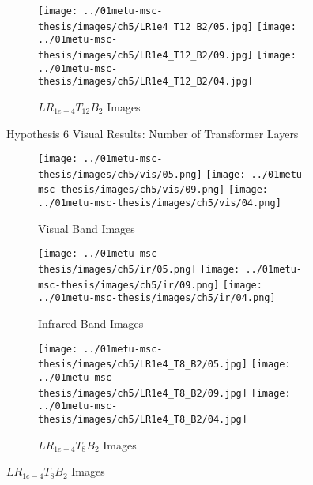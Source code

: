 \begin{figure}[htbp]
    \begin{subfigure}[b]{\textwidth}
        \texttt{[image: ../01metu-msc-thesis/images/ch5/LR1e4\_T12\_B2/05.jpg]}
        \texttt{[image: ../01metu-msc-thesis/images/ch5/LR1e4\_T12\_B2/09.jpg]}
        \texttt{[image: ../01metu-msc-thesis/images/ch5/LR1e4\_T12\_B2/04.jpg]}
        \caption{$LR_{1e-4}T_{12}B_{2}$ Images}
    \end{subfigure}
    \caption{Hypothesis 6 Visual Results: Number of Transformer Layers }
    \label{fig:ch5:met81}
\end{figure}

\begin{figure}[htbp]
    \centering
    \begin{subfigure}[b]{\textwidth}
        \texttt{[image: ../01metu-msc-thesis/images/ch5/vis/05.png]}
        \texttt{[image: ../01metu-msc-thesis/images/ch5/vis/09.png]}
        \texttt{[image: ../01metu-msc-thesis/images/ch5/vis/04.png]}
        \caption{Visual Band Images}
    \end{subfigure}
    \vspace{0.01cm}
    \begin{subfigure}[b]{\textwidth}
        \texttt{[image: ../01metu-msc-thesis/images/ch5/ir/05.png]}
        \texttt{[image: ../01metu-msc-thesis/images/ch5/ir/09.png]}
        \texttt{[image: ../01metu-msc-thesis/images/ch5/ir/04.png]}
        \caption{Infrared Band Images}
    \end{subfigure}
    \vspace{0.01cm}
    \begin{subfigure}[b]{\textwidth}
        \texttt{[image: ../01metu-msc-thesis/images/ch5/LR1e4\_T8\_B2/05.jpg]}
        \texttt{[image: ../01metu-msc-thesis/images/ch5/LR1e4\_T8\_B2/09.jpg]}
        \texttt{[image: ../01metu-msc-thesis/images/ch5/LR1e4\_T8\_B2/04.jpg]}
        \caption{$LR_{1e-4}T_{8}B_{2}$ Images}

\end{subfigure}
\end{figure}
